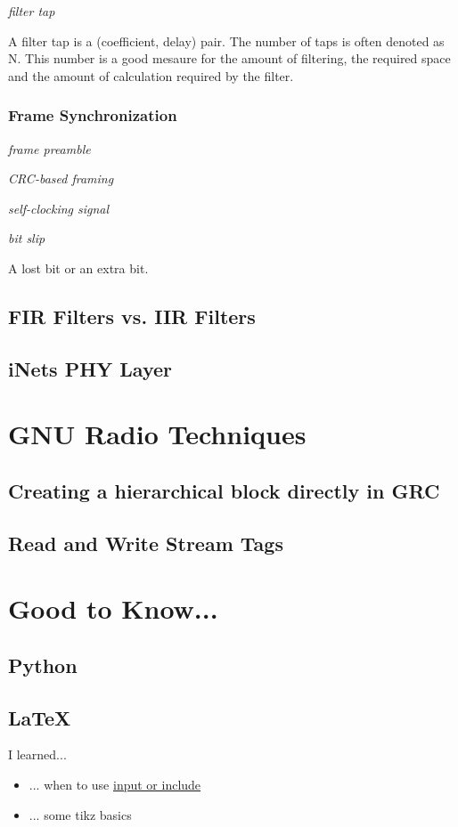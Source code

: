\documentclass{article}
\begin{document}
\bigskip

\emph{filter tap}

A filter tap is a (coefficient, delay) pair. The number of taps is often denoted as N. This number is a good mesaure for the amount of filtering, the required space and the amount of calculation required by the filter. 

\subsubsection{Frame Synchronization}

\emph{frame preamble}

\bigskip

\emph{CRC-based framing}

\bigskip

\emph{self-clocking signal}

\bigskip

\emph{bit slip}

A lost bit or an extra bit.

\subsection{FIR Filters vs. IIR Filters} 

\subsection{iNets PHY Layer}

\section{GNU Radio Techniques}

\subsection{Creating a hierarchical block directly in GRC}

\subsection{Read and Write Stream Tags}

\section{Good to Know...}

\subsection{Python}

\subsection{\LaTeX}

I learned...

\begin{itemize}
	\item ... when to use \href{https://tex.stackexchange.com/questions/246/when-should-i-use-input-vs-include}{input or include}
	\item ... some tikz basics
\end{itemize}
\end{document}
